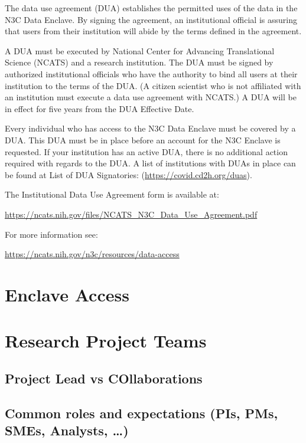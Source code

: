 \documentclass[
  letterpaper,
  DIV=11,
  numbers=noendperiod]{scrreprt}
\begin{document}
The data use agreement (DUA) establishes the permitted uses of the data
in the N3C Data Enclave. By signing the agreement, an institutional
official is assuring that users from their institution will abide by the
terms defined in the agreement.

A DUA must be executed by National Center for Advancing Translational
Science (NCATS) and a research institution. The DUA must be signed by
authorized institutional officials who have the authority to bind all
users at their institution to the terms of the DUA. (A citizen scientist
who is not affiliated with an institution must execute a data use
agreement with NCATS.) A DUA will be in effect for five years from the
DUA Effective Date.

Every individual who has access to the N3C Data Enclave must be covered
by a DUA. This DUA must be in place before an account for the N3C
Enclave is requested. If your institution has an active DUA, there is no
additional action required with regards to the DUA. A list of
institutions with DUAs in place can be found at List of DUA Signatories:
(\url{https://covid.cd2h.org/duas}).

The Institutional Data Use Agreement form is available at:

\url{https://ncats.nih.gov/files/NCATS_N3C_Data_Use_Agreement.pdf}

For more information see:

\url{https://ncats.nih.gov/n3c/resources/data-access}

\hypertarget{enclave-access}{%
\section{Enclave Access}\label{enclave-access}}

\hypertarget{research-project-teams}{%
\section{Research Project Teams}\label{research-project-teams}}

\hypertarget{project-lead-vs-collaborations}{%
\subsection{Project Lead vs
COllaborations}\label{project-lead-vs-collaborations}}

\hypertarget{common-roles-and-expectations-pis-pms-smes-analysts}{%
\subsection{Common roles and expectations (PIs, PMs, SMEs, Analysts,
\ldots)}\label{common-roles-and-expectations-pis-pms-smes-analysts}}
\end{document}
